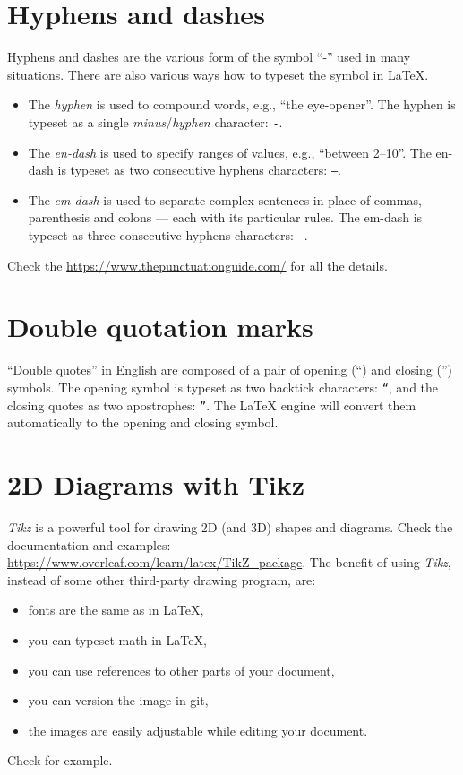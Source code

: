 \section{Hyphens and dashes}

Hyphens and dashes are the various form of the symbol ``-'' used in many situations.
There are also various ways how to typeset the symbol in LaTeX.
\begin{itemize}
  \item The \emph{hyphen} is used to compound words, e.g., ``the eye-opener''. The hyphen is typeset as a single \emph{minus}/\emph{hyphen} character: \texttt{-}.
  \item The \emph{en-dash} is used to specify ranges of values, e.g., ``between 2--10''. The en-dash is typeset as two consecutive hyphens characters: \texttt{--}.
  \item The \emph{em-dash} is used to separate complex sentences in place of commas, parenthesis and colons --- each with its particular rules. The em-dash is typeset as three consecutive hyphens characters: \texttt{---}.
\end{itemize}
Check the \url{https://www.thepunctuationguide.com/} for all the details.

\section{Double quotation marks}

``Double quotes'' in English are composed of a pair of opening (``) and closing ('') symbols.
The opening symbol is typeset as two backtick characters: \texttt{``}, and the closing quotes as two apostrophes: \texttt{''}.
The LaTeX engine will convert them automatically to the opening and closing symbol.

\section{2D Diagrams with Tikz}

\emph{Tikz} is a powerful tool for drawing 2D (and 3D) shapes and diagrams.
Check the documentation and examples: \url{https://www.overleaf.com/learn/latex/TikZ_package}.
The benefit of using \emph{Tikz}, instead of some other third-party drawing program, are:
\begin{itemize}
  \item fonts are the same as in LaTeX,
  \item you can typeset math in LaTeX,
  \item you can use references to other parts of your document,
  \item you can version the image in git,
  \item the images are easily adjustable while editing your document.
\end{itemize}
Check  for example.

